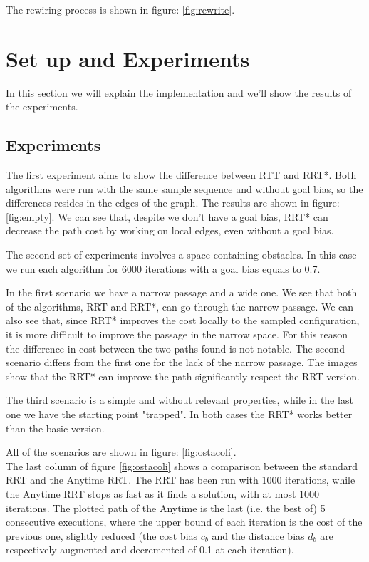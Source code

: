 \documentclass[10pt]{article}
\begin{document}
	The rewiring process is shown in figure: \ref{fig:rewrite}.

	\newpage
	\section{Set up and Experiments}
	In this section we will explain the implementation and we'll show the results of the experiments.

	\subsection{Experiments}
	
	The first experiment aims to show the difference between RTT and RRT*. Both algorithms were run with the same sample sequence and without goal bias, so the differences resides in the edges of the graph. The results are shown in figure: \ref{fig:empty}. We can see that, despite we don't have a goal bias, RRT* can decrease the path cost by working on local edges, even without a goal bias.
	
	The second set of experiments involves a space containing obstacles. In this case we run each algorithm for 6000 iterations with a goal bias equals to 0.7.
	
	In the first scenario we have a narrow passage and a wide one. We see that both of the algorithms, RRT and RRT*, can go through the narrow passage. We can also see that, since RRT* improves the cost locally to the sampled configuration, it is more difficult to improve the passage in the narrow space. For this reason the difference in cost between the two paths found is not notable. The second scenario differs from the first one for the lack of the narrow passage. The images show that the RRT* can improve the path significantly respect the RRT version.
	
	The third scenario is a simple and without relevant properties, while in the last one we have the starting point "trapped". In both cases the RRT* works better than the basic version.
	
	
	All of the scenarios are shown in figure: \ref{fig:ostacoli}.\\
	The last column of figure \ref{fig:ostacoli} shows a comparison between the standard RRT and the Anytime RRT. The RRT has been run with 1000 iterations, while the Anytime RRT stops as fast as it finds a solution, with at most 1000 iterations. The plotted path of the Anytime is the last (i.e. the best of) 5 consecutive executions, where the upper bound of each iteration is the cost of the previous one, slightly reduced (the cost bias $c_b$ and the distance bias $d_b$ are respectively augmented and decremented of 0.1 at each iteration).
	
\end{document}
